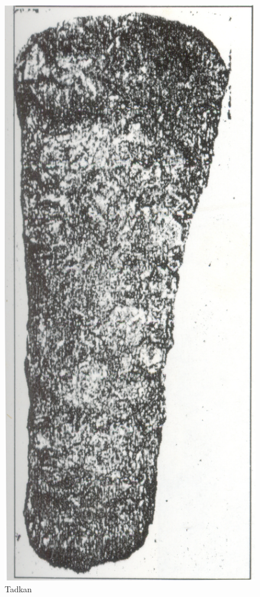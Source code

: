 \begin{figure}[H]
\renewcommand{\thefigure}{17C}
\includegraphics[scale=0.45]{images/chapter-4/fig017C.jpg}
\caption{Tadkan}\label{chapter-4-fig17C}
\end{figure}


